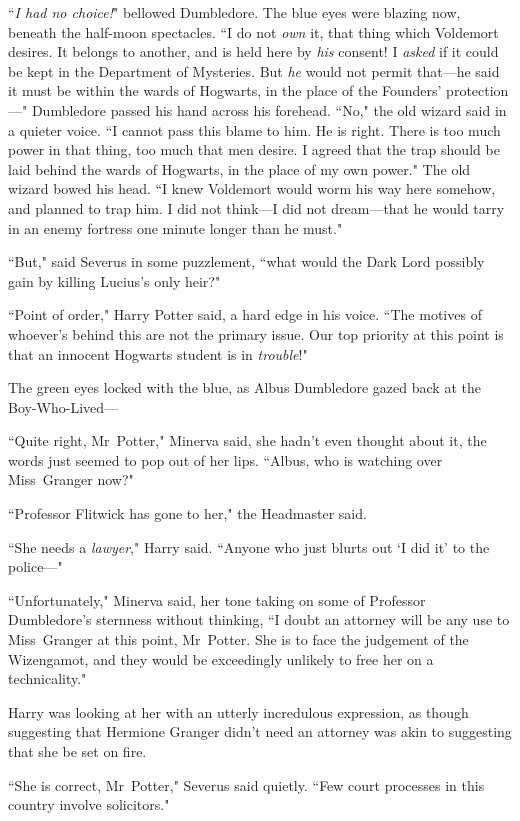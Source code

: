 ``\emph{I had no choice!}" bellowed Dumbledore. The blue eyes were blazing now, beneath the half-moon spectacles. ``I do not \emph{own} it, that thing which Voldemort desires. It belongs to another, and is held here by \emph{his} consent! I \emph{asked} if it could be kept in the Department of Mysteries. But \emph{he} would not permit that—he said it must be within the wards of Hogwarts, in the place of the Founders' protection—" Dumbledore passed his hand across his forehead. ``No," the old wizard said in a quieter voice. ``I cannot pass this blame to him. He is right. There is too much power in that thing, too much that men desire. I agreed that the trap should be laid behind the wards of Hogwarts, in the place of my own power." The old wizard bowed his head. ``I knew Voldemort would worm his way here somehow, and planned to trap him. I did not think—I did not dream—that he would tarry in an enemy fortress one minute longer than he must."

``But," said Severus in some puzzlement, ``what would the Dark Lord possibly gain by killing Lucius's only heir?"

``Point of order," Harry Potter said, a hard edge in his voice. ``The motives of whoever's behind this are not the primary issue. Our top priority at this point is that an innocent Hogwarts student is in \emph{trouble}!"

The green eyes locked with the blue, as Albus Dumbledore gazed back at the Boy-Who-Lived—

``Quite right, Mr~Potter," Minerva said, she hadn't even thought about it, the words just seemed to pop out of her lips. ``Albus, who is watching over Miss~Granger now?"

``Professor Flitwick has gone to her," the Headmaster said.

``She needs a \emph{lawyer}," Harry said. ``Anyone who just blurts out `I did it' to the police—"

``Unfortunately," Minerva said, her tone taking on some of Professor Dumbledore's sternness without thinking, ``I doubt an attorney will be any use to Miss~Granger at this point, Mr~Potter. She is to face the judgement of the Wizengamot, and they would be exceedingly unlikely to free her on a technicality."

Harry was looking at her with an utterly incredulous expression, as though suggesting that Hermione Granger didn't need an attorney was akin to suggesting that she be set on fire.

``She is correct, Mr~Potter," Severus said quietly. ``Few court processes in this country involve solicitors."

